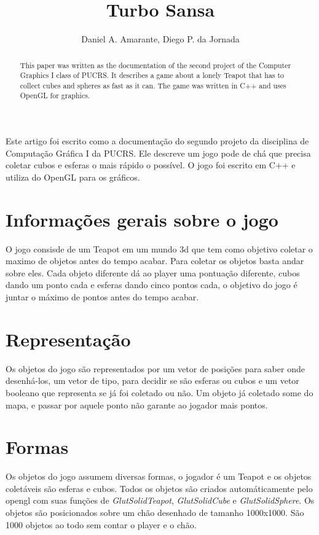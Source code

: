 \documentclass[12pt]{article}
\title{Turbo Sansa}
\author{Daniel A. Amarante, Diego P. da Jornada}
\begin{document}
 

\maketitle

\begin{abstract}
  This paper was written as the documentation of the second project of the Computer Graphics I class of PUCRS. It describes a game about a lonely Teapot that has to collect cubes and spheres as fast as it can. The game was written in C++ and uses OpenGL for graphics.
\end{abstract}
     
\begin{resumo} 
  Este artigo foi escrito como a documentação do segundo projeto da disciplina de Computação Gráfica I da PUCRS. Ele descreve um jogo pode de chá que precisa coletar cubos e esferas o mais rápido o possível. O jogo foi escrito em C++ e utiliza do OpenGL para os gráficos.
\end{resumo}


\section{Informações gerais sobre o jogo}

O jogo consisde de um Teapot em um mundo 3d que tem como objetivo coletar o maximo de objetos antes do tempo acabar. Para coletar os objetos basta andar sobre eles. Cada objeto diferente dá ao player uma pontuação diferente, cubos dando um ponto cada e esferas dando cinco pontos cada, o objetivo do jogo é juntar o máximo de pontos antes do tempo acabar.

\section{Representação}

Os objetos do jogo são representados por um vetor de posições para saber onde desenhá-los, um vetor de tipo, para decidir se são esferas ou cubos e um vetor booleano que representa se já foi coletado ou não. Um objeto já coletado some do mapa, e passar por aquele ponto não garante ao jogador mais pontos.

\section{Formas}

Os objetos do jogo assumem diversas formas, o jogador é um Teapot e os objetos coletáveis são esferas e cubos. Todos os objetos são criados automáticamente pelo opengl com suas funções de \emph{GlutSolidTeapot}, \emph{GlutSolidCube} e \emph{GlutSolidSphere}. Os objetos são posicionados sobre um chão desenhado de tamanho 1000x1000. São 1000 objetos ao todo sem contar o player e o chão.
\end{document}
